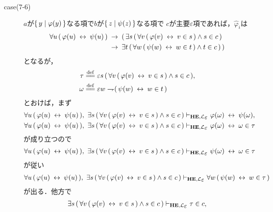 \begin{metaprf}
\begin{description}
\begin{description}
					\item[case(7-6)] $a$が$\{\, y \mid \varphi(y)\, \}$なる項で$b$が$\{\, z \mid \psi(z)\, \}$なる項で
						$c$が主要$\varepsilon$項であれば，$\widehat{\varphi}_{i}$は
						\begin{align}
							\forall u\, (\, \varphi(u) \hspace{0.25em}\leftrightarrow\hspace{0.25em} \psi(u)\, ) 
							&\hspace{0.25em}\rightarrow\hspace{0.25em} (\, \exists s\, (\, \forall v\, (\, \varphi(v) \hspace{0.25em}\leftrightarrow\hspace{0.25em} v \in s\, ) \wedge s \in c\, ) \\
							&\hspace{0.25em}\rightarrow\hspace{0.25em} \exists t\, (\, \forall w\, (\, \psi(w) \hspace{0.25em}\leftrightarrow\hspace{0.25em} w \in t\, ) \wedge t \in c\, )\, )
						\end{align}
						となるが，
						\begin{align}
							\tau &\defeq \varepsilon s\, (\, \forall v\, (\, \varphi(v) \lrarrow v \in s\, ) \wedge s \in c\, ), \\
							\omega &\defeq \varepsilon w \negation (\, \psi(w) \lrarrow w \in t\, )
						\end{align}
						とおけば，まず
						\begin{align}
							\forall u\, (\, \varphi(u) \lrarrow \psi(u)\, ),\ 
							\exists s\, (\, \forall v\, (\, \varphi(v) \lrarrow v \in s\, ) \wedge s \in c\, )
							&\provable{\mbox{{\bf HE}},\lang{\varepsilon}} \varphi(\omega) \lrarrow \psi(\omega), \\
							\forall u\, (\, \varphi(u) \lrarrow \psi(u)\, ),\ 
							\exists s\, (\, \forall v\, (\, \varphi(v) \lrarrow v \in s\, ) \wedge s \in c\, )
							&\provable{\mbox{{\bf HE}},\lang{\varepsilon}} \varphi(\omega) \lrarrow \omega \in \tau
						\end{align}
						が成り立つので
						\begin{align}
							\forall u\, (\, \varphi(u) \lrarrow \psi(u)\, ),\ 
							\exists s\, (\, \forall v\, (\, \varphi(v) \lrarrow v \in s\, ) \wedge s \in c\, )
							\provable{\mbox{{\bf HE}},\lang{\varepsilon}} \psi(\omega) \lrarrow \omega \in \tau
						\end{align}
						が従い
						\begin{align}
							\forall u\, (\, \varphi(u) \lrarrow \psi(u)\, ),\ 
							\exists s\, (\, \forall v\, (\, \varphi(v) \lrarrow v \in s\, ) \wedge s \in c\, )
							\provable{\mbox{{\bf HE}},\lang{\varepsilon}} \forall w\, (\, \psi(w) \lrarrow w \in \tau\, )
						\end{align}
						が出る．他方で
						\begin{align}
							\exists s\, (\, \forall v\, (\, \varphi(v) \lrarrow v \in s\, ) \wedge s \in c\, )
							\provable{\mbox{{\bf HE}},\lang{\varepsilon}} \tau \in c, \\

\end{align}
\end{description}
\end{description}
\end{metaprf}
